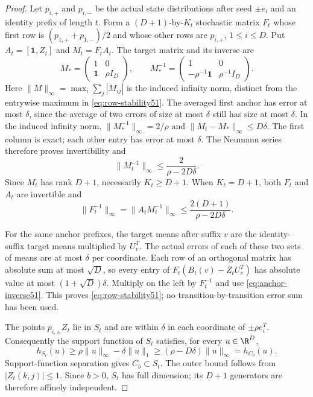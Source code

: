 \begin{proof}
Let $p_{i,+}$ and $p_{i,-}$ be the actual state distributions after
seed $\pm e_i$ and an identity prefix of length $t$. Form a
$(D+1)$-by-$K_t$ stochastic matrix $F_t$ whose first row is
$(p_{1,+}+p_{1,-})/2$ and whose other rows are $p_{i,+}$,
$1\le i\le D$. Put $A_t=[\mathbf1,Z_t]$ and $M_t=F_tA_t$.
The target matrix and its inverse are
\[
 M_* =\begin{pmatrix}1&0\\\mathbf1&\rho I_D\end{pmatrix},
 \qquad
 M_*^{-1}=\begin{pmatrix}1&0\\-\rho^{-1}\mathbf1&\rho^{-1}I_D\end{pmatrix}.
\]
Here $\|M\|_\infty=\max_i\sum_j|M_{ij}|$ is the induced infinity
norm, distinct from the entrywise maximum in
\eqref{eq:row-stability51}. The averaged first anchor has error at most
$\delta$, since the average of two errors of size at most $\delta$
still has size at most $\delta$. In the induced infinity norm,
$\|M_*^{-1}\|_\infty=2/\rho$ and
$\|M_t-M_*\|_\infty\le D\delta$. The first column is exact;
each other entry has error at most $\delta$. The Neumann series
therefore proves invertibility and
\[
 \|M_t^{-1}\|_\infty\le\frac{2}{\rho-2D\delta}.
\]
Since $M_t$ has rank $D+1$, necessarily $K_t\ge D+1$.
When $K_t=D+1$, both $F_t$ and $A_t$ are invertible and
\begin{equation}\label{eq:anchor-inverse51}
 \|F_t^{-1}\|_\infty
 =\|A_tM_t^{-1}\|_\infty
 \le\frac{2(D+1)}{\rho-2D\delta}.
\end{equation}

For the same anchor prefixes, the target means after suffix $v$ are
the identity-suffix target means multiplied by $U_v^T$. The actual
errors of each of these two sets of means are at most $\delta$ per
coordinate. Each row of an orthogonal matrix has absolute sum at most
$\sqrt D$, so every entry of
$F_t(B_t(v)-Z_tU_v^T)$ has absolute value at most
$(1+\sqrt D)\delta$. Multiply on the left by $F_t^{-1}$ and use
\eqref{eq:anchor-inverse51}. This proves
\eqref{eq:row-stability51}; no transition-by-transition error sum has
been used.

The points $p_{i,\pm}Z_t$ lie in $S_t$ and are within $\delta$ in
each coordinate of $\pm\rho e_i^T$. Consequently the support
function of $S_t$ satisfies, for every $u\in\R^D$,
\[
 h_{S_t}(u)\ge\rho\|u\|_\infty-\delta\|u\|_1
             \ge(\rho-D\delta)\|u\|_\infty=h_{C_b}(u).
\]
Support-function separation gives $C_b\subset S_t$. The outer
bound follows from $|Z_t(k,j)|\le1$. Since $b>0$, $S_t$ has full
dimension; its $D+1$ generators are therefore affinely independent.
\end{proof}

